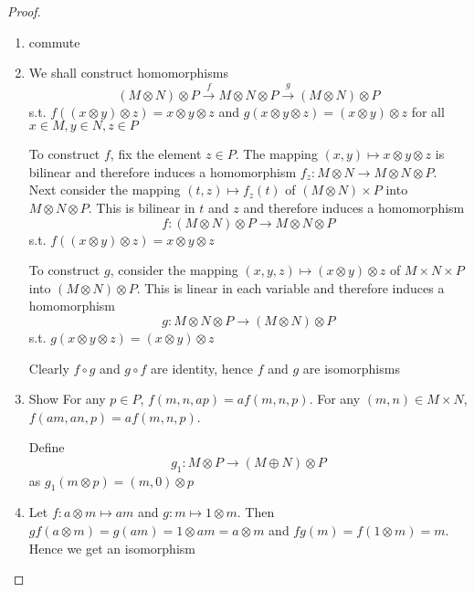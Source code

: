 \documentclass[11pt]{article}
\begin{document}
\begin{proof}
\begin{enumerate}
\item commute
\begin{center}\end{center}

\item We shall construct homomorphisms
\begin{equation*}
(M\otimes N)\otimes P\xrightarrow{f}M\otimes N\otimes P\xrightarrow{g}(M\otimes N)\otimes P
\end{equation*}
s.t. \(f((x\otimes y)\otimes z)=x\otimes y\otimes z\) and \(g(x\otimes y\otimes z)=(x\otimes y)\otimes z\) for all \(x\in M,y\in N,z\in P\)

To construct \(f\), fix the element \(z\in P\). The mapping \((x,y)\mapsto x\otimes y\otimes z\) is bilinear and
therefore induces a homomorphism \(f_z:M\otimes N\to M\otimes N\otimes P\). Next consider the
mapping \((t,z)\mapsto f_z(t)\) of \((M\otimes N)\times P\) into \(M\otimes N\otimes P\). This is bilinear in \(t\)
and \(z\) and therefore induces a homomorphism
\begin{equation*}
f:(M\otimes N)\otimes P\to M\otimes N\otimes P
\end{equation*}
s.t. \(f((x\otimes y)\otimes z)=x\otimes y\otimes z\)

To construct \(g\), consider the mapping \((x,y,z)\mapsto(x\otimes y)\otimes z\) of \(M\times N\times P\)
into \((M\otimes N)\otimes P\). This is linear in each variable and therefore induces a homomorphism
\begin{equation*}
g:M\otimes N\otimes P\to(M\otimes N)\otimes P
\end{equation*}
s.t. \(g(x\otimes y\otimes z)=(x\otimes y)\otimes z\)

Clearly \(f\circ g\) and \(g\circ f\) are identity, hence \(f\) and \(g\) are isomorphisms

\item Show For any \(p\in P\), \(f(m,n,ap)=af(m,n,p)\). For
any \((m,n)\in M\times N\), \(f(am,an,p)=af(m,n,p)\).

Define
\begin{equation*}
g_1:M\otimes P\to(M\oplus N)\otimes P
\end{equation*}
as \(g_1(m\otimes p)=(m,0)\otimes p\)

\item Let \(f:a\otimes m\mapsto am\) and \(g:m\mapsto 1\otimes m\). Then \(gf(a\otimes m)=g(am)=1\otimes am=a\otimes m\) and
\(fg(m)=f(1\otimes m)=m\). Hence we get an isomorphism
\end{enumerate}
\end{proof}
\end{document}
